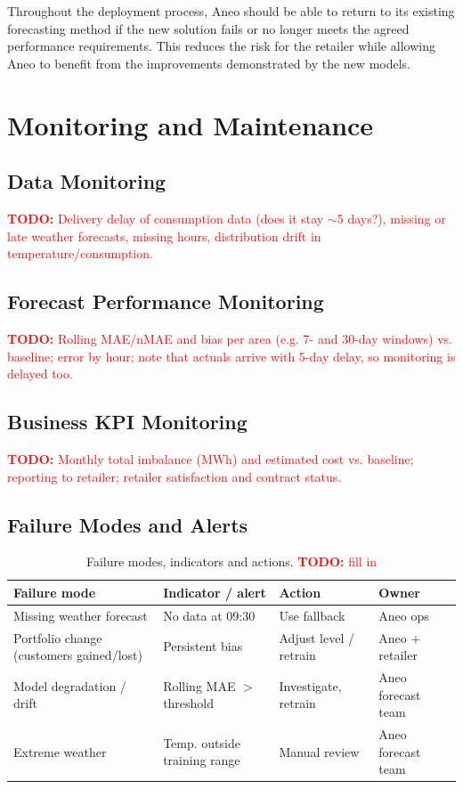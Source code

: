 \documentclass[11pt,a4paper]{article}
\newcommand{\todo}[1]{\textcolor{red}{\textbf{TODO:} #1}}
\newif\ifshowtargets
\newcommand{\pagetarget}[1]{%
  \ifshowtargets
    \noindent{\small\itshape\textcolor{gray}{Target length: #1 pages (indicative)}}\par\medskip
  \fi}
\begin{document}
Throughout the deployment process, Aneo should be able to return to its existing forecasting method if the new solution fails or no longer meets the agreed performance requirements. This reduces the risk for the retailer while allowing Aneo to benefit from the improvements demonstrated by the new models.

\section{Monitoring and Maintenance}
\label{sec:monitoring}
\pagetarget{2--4}

\subsection{Data Monitoring}
\todo{Delivery delay of consumption data (does it stay $\sim$5 days?), missing or late weather forecasts, missing hours, distribution drift in temperature/consumption.}

\subsection{Forecast Performance Monitoring}
\todo{Rolling MAE/nMAE and bias per area (e.g. 7- and 30-day windows) vs. baseline; error by hour; note that actuals arrive with 5-day delay, so monitoring is delayed too.}

\subsection{Business KPI Monitoring}
\todo{Monthly total imbalance (MWh) and estimated cost vs. baseline; reporting to retailer; retailer satisfaction and contract status.}

\subsection{Failure Modes and Alerts}
\begin{table}[H]
\centering
\caption{Failure modes, indicators and actions. \todo{fill in}}
\label{tab:failures}
\begin{tabularx}{\textwidth}{XXXX}
\toprule
Failure mode & Indicator / alert & Action & Owner \\
\midrule
Missing weather forecast & No data at 09:30 & Use fallback & Aneo ops \\
Portfolio change (customers gained/lost) & Persistent bias & Adjust level / retrain & Aneo + retailer \\
Model degradation / drift & Rolling MAE $>$ threshold & Investigate, retrain & Aneo forecast team \\
Extreme weather & Temp. outside training range & Manual review & Aneo forecast team \\
\bottomrule
\end{tabularx}
\end{table}
\end{document}
